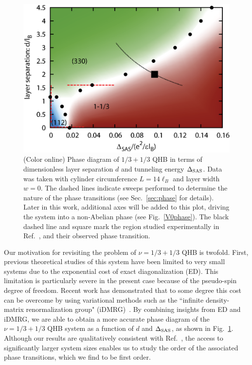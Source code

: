 \begin{figure}[ttt]
	\includegraphics[width=0.6\linewidth]{figures/phase2.eps}
	\caption{\label{phase} (Color online)
		Phase diagram of $1/3+1/3$ QHB in terms of dimensionless layer separation $d$ and tunneling energy $\Delta_\textrm{SAS}$. 
		Data was taken with cylinder circumference $L=14\ell_B$ and layer width $w=0$.
		The dashed lines indicate sweeps performed to determine the nature of the phase transitions (see Sec.~\ref{sec:phase} for details).
		Later in this work, additional axes will be added to this plot, driving the system into a non-Abelian phase (see Fig.~\ref{V0phase}).
		The black dashed line and square mark the region studied experimentally in Ref.~\cite{Hirayama2002b}, and their observed phase transition.
	}
\end{figure}
Our motivation for revisiting the problem of $\nu=1/3+1/3$ QHB is twofold.
First, previous theoretical studies of this system have been limited to very small systems due to the exponential cost of exact diagonalization (ED). 
This limitation is particularly severe in the present case because of the pseudo-spin degree of freedom.
Recent work has demonstrated that to some degree this cost can be overcome by using variational methods such as the ``infinite density-matrix renormalization group" (iDMRG)~\cite{ZaletelQHdmrg13, ZaletelMixing}. 
By combining insights from ED and iDMRG, we are able to obtain a more accurate phase diagram of the $\nu=1/3+1/3$ QHB system as a function of $d$ and $\Delta_\textrm{SAS}$, as shown in Fig.~\ref{phase}. 
Although our results are qualitatively consistent with Ref.~\cite{HaldaneDiagram}, the access to significantly larger system sizes enables us to study the order of the associated phase transitions, which we find to be first order. 

